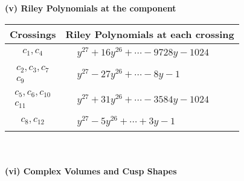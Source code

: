 \documentclass[1p]{elsarticle_modified}
\theoremstyle{definition}
\begin{document}
\newpage\renewcommand{\arraystretch}{1}
\flushleft \textbf{(v) Riley Polynomials at the component}\newline \\
\begin{tabular}{m{50pt}|m{274pt}}
Crossings & \hspace{64pt}Riley Polynomials at each crossing \\
\hline $$\begin{aligned}c_{1},c_{4}\end{aligned}$$&$\begin{aligned}
&y^{27}+16 y^{26}+\cdots-9728 y-1024
\end{aligned}$\\
\hline $$\begin{aligned}c_{2},c_{3},c_{7}\\c_{9}\end{aligned}$$&$\begin{aligned}
&y^{27}-27 y^{26}+\cdots-8 y-1
\end{aligned}$\\
\hline $$\begin{aligned}c_{5},c_{6},c_{10}\\c_{11}\end{aligned}$$&$\begin{aligned}
&y^{27}+31 y^{26}+\cdots-3584 y-1024
\end{aligned}$\\
\hline $$\begin{aligned}c_{8},c_{12}\end{aligned}$$&$\begin{aligned}
&y^{27}-5 y^{26}+\cdots+3 y-1
\end{aligned}$\\
\hline
\end{tabular}\\~\\
\newpage\flushleft \textbf{(vi) Complex Volumes and Cusp Shapes}
\end{document}
